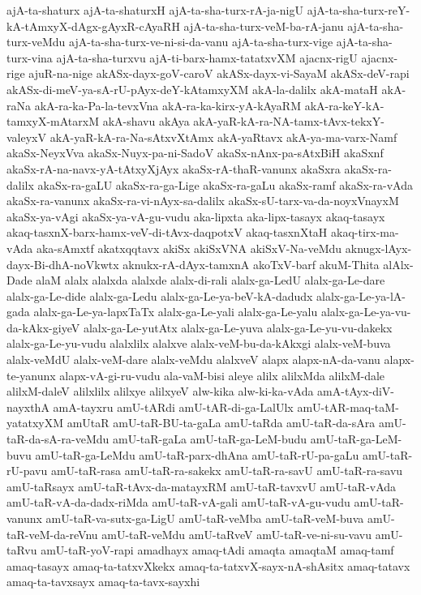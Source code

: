 {ajA-ta-shaturx
ajA-ta-shaturxH
ajA-ta-sha-turx-rA-ja-nigU
ajA-ta-sha-turx-reY-kA-tAmxyX-dAgx-gAyxR-cAyaRH
ajA-ta-sha-turx-veM-ba-rA-janu
ajA-ta-sha-turx-veMdu
ajA-ta-sha-turx-ve-ni-si-da-vanu
ajA-ta-sha-turx-vige
ajA-ta-sha-turx-vina
ajA-ta-sha-turxvu
ajA-ti-barx-hamx-tatatxvXM
ajacnx-rigU
ajacnx-rige
ajuR-na-nige
akASx-dayx-goV-caroV
akASx-dayx-vi-SayaM
akASx-deV-rapi
akASx-di-meV-ya-sA-rU-pAyx-deY-kAtamxyXM
akA-la-dalilx
akA-mataH
akA-raNa
akA-ra-ka-Pa-la-tevxVna
akA-ra-ka-kirx-yA-kAyaRM
akA-ra-keY-kA-tamxyX-mAtarxM
akA-shavu
akAya
akA-yaR-kA-ra-NA-tamx-tAvx-tekxY-valeyxV
akA-yaR-kA-ra-Na-sAtxvXtAmx
akA-yaRtavx
akA-ya-ma-varx-Namf
akaSx-NeyxVva
akaSx-Nuyx-pa-ni-SadoV
akaSx-nAnx-pa-sAtxBiH
akaSxnf
akaSx-rA-na-navx-yA-tAtxyXjAyx
akaSx-rA-thaR-vanunx
akaSxra
akaSx-ra-dalilx
akaSx-ra-gaLU
akaSx-ra-ga-Lige
akaSx-ra-gaLu
akaSx-ramf
akaSx-ra-vAda
akaSx-ra-vanunx
akaSx-ra-vi-nAyx-sa-dalilx
akaSx-sU-tarx-va-da-noyxVnayxM
akaSx-ya-vAgi
akaSx-ya-vA-gu-vudu
aka-lipxta
aka-lipx-tasayx
akaq-tasayx
akaq-tasxnX-barx-hamx-veV-di-tAvx-daqpotxV
akaq-tasxnXtaH
akaq-tirx-ma-vAda
aka-sAmxtf
akatxqqtavx
akiSx
akiSxVNA
akiSxV-Na-veMdu
aknugx-lAyx-dayx-Bi-dhA-noVkwtx
aknukx-rA-dAyx-tamxnA
akoTxV-barf
akuM-Thita
alAlx-Dade
alaM
alalx
alalxda
alalxde
alalx-di-rali
alalx-ga-LedU
alalx-ga-Le-dare
alalx-ga-Le-dide
alalx-ga-Ledu
alalx-ga-Le-ya-beV-kA-dadudx
alalx-ga-Le-ya-lA-gada
alalx-ga-Le-ya-lapxTaTx
alalx-ga-Le-yali
alalx-ga-Le-yalu
alalx-ga-Le-ya-vu-da-kAkx-giyeV
alalx-ga-Le-yutAtx
alalx-ga-Le-yuva
alalx-ga-Le-yu-vu-dakekx
alalx-ga-Le-yu-vudu
alalxlilx
alalxve
alalx-veM-bu-da-kAkxgi
alalx-veM-buva
alalx-veMdU
alalx-veM-dare
alalx-veMdu
alalxveV
alapx
alapx-nA-da-vanu
alapx-te-yanunx
alapx-vA-gi-ru-vudu
ala-vaM-bisi
aleye
alilx
alilxMda
alilxM-dale
alilxM-daleV
alilxlilx
alilxye
alilxyeV
alw-kika
alw-ki-ka-vAda
amA-tAyx-diV-nayxthA
amA-tayxru
amU-tARdi
amU-tAR-di-ga-LalUlx
amU-tAR-maq-taM-yatatxyXM
amUtaR
amU-taR-BU-ta-gaLa
amU-taRda
amU-taR-da-sAra
amU-taR-da-sA-ra-veMdu
amU-taR-gaLa
amU-taR-ga-LeM-budu
amU-taR-ga-LeM-buvu
amU-taR-ga-LeMdu
amU-taR-parx-dhAna
amU-taR-rU-pa-gaLu
amU-taR-rU-pavu
amU-taR-rasa
amU-taR-ra-sakekx
amU-taR-ra-savU
amU-taR-ra-savu
amU-taRsayx
amU-taR-tAvx-da-matayxRM
amU-taR-tavxvU
amU-taR-vAda
amU-taR-vA-da-dadx-riMda
amU-taR-vA-gali
amU-taR-vA-gu-vudu
amU-taR-vanunx
amU-taR-va-sutx-ga-LigU
amU-taR-veMba
amU-taR-veM-buva
amU-taR-veM-da-reVnu
amU-taR-veMdu
amU-taRveV
amU-taR-ve-ni-su-vavu
amU-taRvu
amU-taR-yoV-rapi
amadhayx
amaq-tAdi
amaqta
amaqtaM
amaq-tamf
amaq-tasayx
amaq-ta-tatxvXkekx
amaq-ta-tatxvX-sayx-nA-shAsitx
amaq-tatavx
amaq-ta-tavxsayx
amaq-ta-tavx-sayxhi
}
